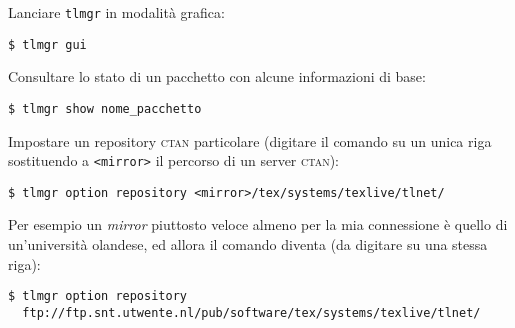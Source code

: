 Lanciare \texttt{tlmgr} in modalità grafica:
\begin{verbatim}
$ tlmgr gui
\end{verbatim}

Consultare lo stato di un pacchetto con alcune informazioni di base:
\begin{verbatim}
$ tlmgr show nome_pacchetto
\end{verbatim}

Impostare un repository \textsc{ctan} particolare (digitare il comando su un
unica riga sostituendo a \texttt{<mirror>} il percorso di un server
\textsc{ctan}):
\begin{verbatim}
$ tlmgr option repository <mirror>/tex/systems/texlive/tlnet/
\end{verbatim}

Per esempio un \emph{mirror} piuttosto veloce almeno per la mia connessione è
quello di un'università olandese, ed allora il comando diventa (da digitare su
una stessa riga):
\begin{Verbatim}[fontsize=\small]
$ tlmgr option repository
  ftp://ftp.snt.utwente.nl/pub/software/tex/systems/texlive/tlnet/
\end{Verbatim}



